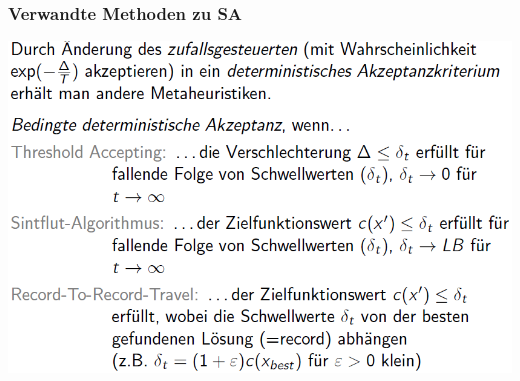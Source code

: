 \documentclass[12pt]{article}
\begin{document}
			\subsubsection{Verwandte Methoden zu SA}
				\includegraphics[scale=0.6]{VerwandtZuSa}
\end{document}
